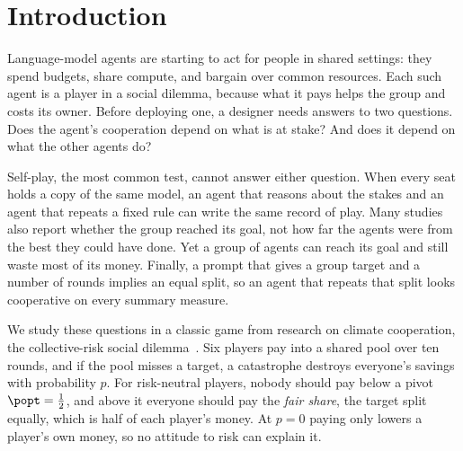\section{Introduction}
\label{sec:intro}


Language-model agents are starting to act for people in shared settings: they spend
budgets, share compute, and bargain over common resources. Each such agent is a player in a
social dilemma, because what it pays helps the group and costs its owner. Before deploying
one, a designer needs answers to two questions. Does the agent's cooperation depend on what
is at stake? And does it depend on what the other agents do?

Self-play, the most common test, cannot answer either question. When every seat holds a copy
of the same model, an agent that reasons about the stakes and an agent that repeats a fixed
rule can write the same record of play. Many studies also report whether the group reached
its goal, not how far the agents were from the best they could have done. Yet a group of
agents can reach its goal and still waste most of its money. Finally, a prompt that gives a
group target and a number of rounds implies an equal split, so an agent that repeats that
split looks cooperative on every summary measure.

We study these questions in a classic game from research on climate cooperation, the
collective-risk social dilemma~\cite{milinski2008collective}. Six players pay into a shared
pool over ten rounds, and if the pool misses a target, a catastrophe destroys everyone's
savings with probability $p$. For risk-neutral players, nobody should pay below a pivot
$\popt=\tfrac12$, and above it everyone should pay the \emph{fair share}, the target split
equally, which is half of each player's money. At $p=0$ paying only lowers a player's own
money, so no attitude to risk can explain it.

